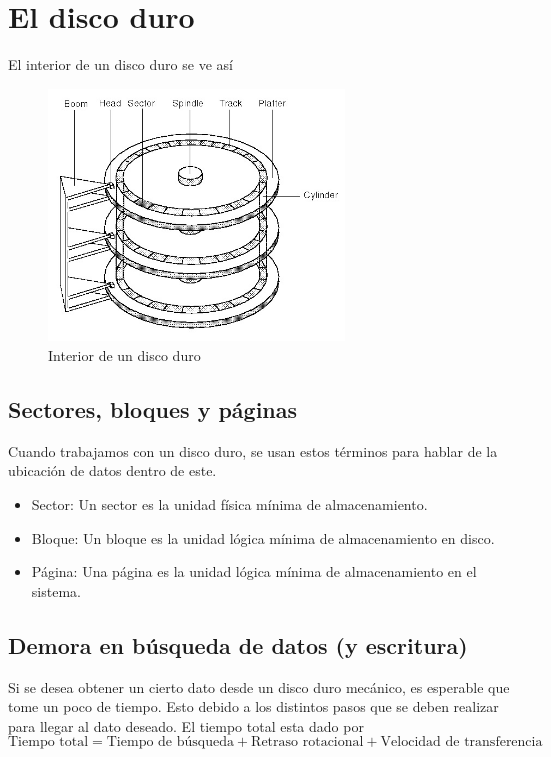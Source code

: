 \section{El disco duro}
El interior de un disco duro se ve así
\begin{figure}[h]
  \centering
  \includegraphics[width=0.7\textwidth]{img/disk_anatomy.png}
  \caption{Interior de un disco duro}
\end{figure}

\subsection{Sectores, bloques y páginas}
Cuando trabajamos con un disco duro, se usan estos términos para hablar de la ubicación de datos dentro de este.
\begin{itemize}
  \item Sector: Un sector es la unidad física mínima de almacenamiento.
  \item Bloque: Un bloque es la unidad lógica mínima de almacenamiento en disco.
  \item Página: Una página es la unidad lógica mínima de almacenamiento en el sistema.
\end{itemize}

\subsection{Demora en búsqueda de datos (y escritura)}
Si se desea obtener un cierto dato desde un disco duro mecánico, es esperable que tome un poco de tiempo. Esto debido a los distintos pasos que se deben realizar para llegar al dato deseado. El tiempo total esta dado por
\[ \text{Tiempo total} = \text{Tiempo de búsqueda} + \text{Retraso rotacional} + \text{Velocidad de transferencia} \]

